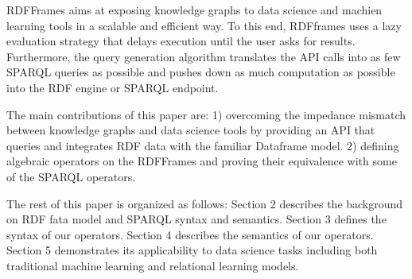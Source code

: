 RDFFrames aims at exposing knowledge graphs to data science and machien learning tools in a scalable and efficient way.
To this end, RDFframes uses a lazy evaluation strategy that delays execution until the user asks for results.
Furthermore, the query generation algorithm translates the API calls into as few SPARQL queries as possible and pushes down as much computation as possible into the RDF engine or SPARQL endpoint.


The main contributions of this paper are: 1) overcoming the impedance mismatch between knowledge graphs and data science tools by providing an API that queries and integrates RDF data with the familiar Dataframe model. 2) defining algebraic operators on the RDFFrames and proving their equivalence with some of the SPARQL operators. 

The rest of this paper is organized as follows: Section 2 describes the background on RDF fata model and SPARQL syntax and semantics. Section 3 defines the syntax of our operators. Section 4 describes the semantics of our operators. Section 5 demonstrates its applicability to data science tasks including both traditional machine learning and relational learning models. 